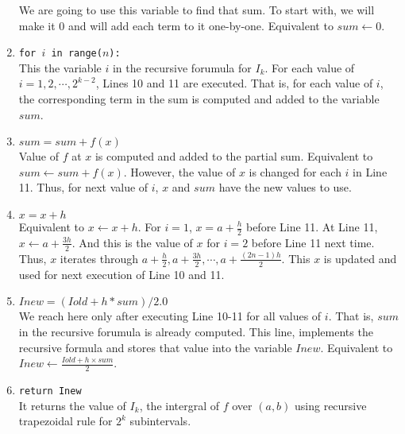 \begin{commentary}
\begin{enumerate}[label=Line \arabic*]
		We are going to use this variable to find that sum. To start with, we will make it $0$ and will add each term to it one-by-one. Equivalent to $sum \leftarrow 0$.
	\item \texttt{for $i$ in range($n$):}\\
		This the variable $i$ in the recursive forumula for $I_k$. For each value of $i = 1,2,\cdots,2^{k-2}$, Lines 10 and 11 are executed. That is, for each value of $i$, the corresponding term in the sum is computed and added to the variable $sum$.
	\item \texttt{$sum = sum + f(x)$}\\
		Value of $f$ at $x$ is computed and added to the partial sum. Equivalent to $sum \leftarrow sum + f(x)$. However, the value of $x$ is changed for each $i$ in Line 11. Thus, for next value of $i$, $x$ and $sum$ have the new values to use.
	\item \texttt{$x = x + h$}\\
		Equivalent to $x \leftarrow x+h$. For $i=1$, $x = a + \frac{h}{2}$ before Line 11. At Line 11, $x \leftarrow a+\frac{3h}{2}$. And this is the value of $x$ for $i = 2$ before Line 11 next time. Thus, $x$ iterates through $a+\frac{h}{2}, a+\frac{3h}{2}, \cdots, a+\frac{(2n-1)h}{2}$. This $x$ is updated and used for next execution of Line 10 and 11.
	\item \texttt{$Inew = (Iold + h * sum ) / 2.0$}\\
		We reach here only after executing Line 10-11 for all values of $i$. That is, $sum$ in the recursive forumula is already computed. This line, implements the recursive formula and stores that value into the variable $Inew$. Equivalent to $Inew \leftarrow \frac{Iold + h \times sum}{2}$.
	\item \texttt{return Inew}\\
		It returns the value of $I_k$, the intergral of $f$ over $(a,b)$ using recursive trapezoidal rule for $2^k$ subintervals.
\end{enumerate}
\end{commentary}
